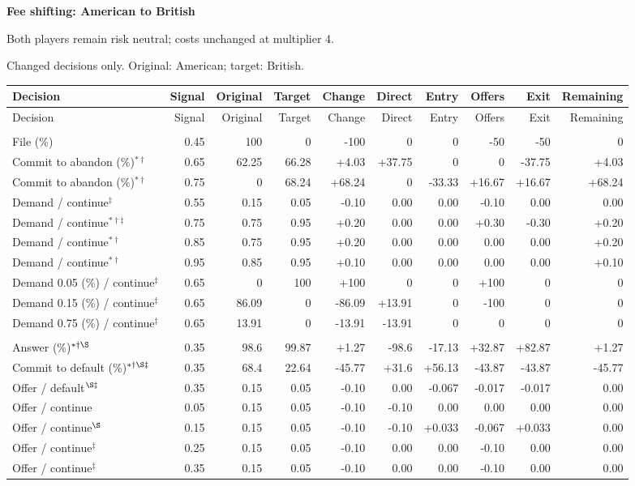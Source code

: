 \documentclass[10pt]{article}
\begin{document}
{\large\bfseries Fee shifting: American to British}\par
Both players remain risk neutral; costs unchanged at multiplier 4.\par
{\small Changed decisions only. Original: American; target: British.}\par
{\small\setlength{\tabcolsep}{3pt}\begin{longtable}{@{}>{\raggedright\arraybackslash}p{1.65in}rrrrrrrrr@{}}
\toprule Decision & Signal & Original & Target & Change & Direct & Entry & Offers & Exit & Remaining \\\midrule\endfirsthead
\toprule Decision & Signal & Original & Target & Change & Direct & Entry & Offers & Exit & Remaining \\\midrule\endhead
\bottomrule\endfoot
\multicolumn{10}{@{}l}{\textbf{Plaintiff}}\\
File (\%) & 0.45 & 100 & 0 & -100 & 0 & 0 & -50 & -50 & 0\\
Commit to abandon (\%)$^{*\dagger}$ & 0.65 & 62.25 & 66.28 & +4.03 & +37.75 & 0 & 0 & -37.75 & +4.03\\
Commit to abandon (\%)$^{*\dagger}$ & 0.75 & 0 & 68.24 & +68.24 & 0 & -33.33 & +16.67 & +16.67 & +68.24\\
Demand / continue$^{\ddagger}$ & 0.55 & 0.15 & 0.05 & -0.10 & 0.00 & 0.00 & -0.10 & 0.00 & 0.00\\
Demand / continue$^{*\dagger\ddagger}$ & 0.75 & 0.75 & 0.95 & +0.20 & 0.00 & 0.00 & +0.30 & -0.30 & +0.20\\
Demand / continue$^{*\dagger}$ & 0.85 & 0.75 & 0.95 & +0.20 & 0.00 & 0.00 & 0.00 & 0.00 & +0.20\\
Demand / continue$^{*\dagger}$ & 0.95 & 0.85 & 0.95 & +0.10 & 0.00 & 0.00 & 0.00 & 0.00 & +0.10\\
Demand 0.05 (\%) / continue$^{\ddagger}$ & 0.65 & 0 & 100 & +100 & 0 & 0 & +100 & 0 & 0\\
Demand 0.15 (\%) / continue$^{\ddagger}$ & 0.65 & 86.09 & 0 & -86.09 & +13.91 & 0 & -100 & 0 & 0\\
Demand 0.75 (\%) / continue$^{\ddagger}$ & 0.65 & 13.91 & 0 & -13.91 & -13.91 & 0 & 0 & 0 & 0\\
\multicolumn{10}{@{}l}{\textbf{Defendant}}\\
Answer (\%)$^{*\dagger\S}$ & 0.35 & 98.6 & 99.87 & +1.27 & -98.6 & -17.13 & +32.87 & +82.87 & +1.27\\
Commit to default (\%)$^{*\dagger\S\ddagger}$ & 0.35 & 68.4 & 22.64 & -45.77 & +31.6 & +56.13 & -43.87 & -43.87 & -45.77\\
Offer / default$^{\S\ddagger}$ & 0.35 & 0.15 & 0.05 & -0.10 & 0.00 & -0.067 & -0.017 & -0.017 & 0.00\\
Offer / continue & 0.05 & 0.15 & 0.05 & -0.10 & -0.10 & 0.00 & 0.00 & 0.00 & 0.00\\
Offer / continue$^{\S}$ & 0.15 & 0.15 & 0.05 & -0.10 & -0.10 & +0.033 & -0.067 & +0.033 & 0.00\\
Offer / continue$^{\ddagger}$ & 0.25 & 0.15 & 0.05 & -0.10 & 0.00 & 0.00 & -0.10 & 0.00 & 0.00\\
Offer / continue$^{\ddagger}$ & 0.35 & 0.15 & 0.05 & -0.10 & 0.00 & 0.00 & -0.10 & 0.00 & 0.00\\
\end{longtable}}
\end{document}
